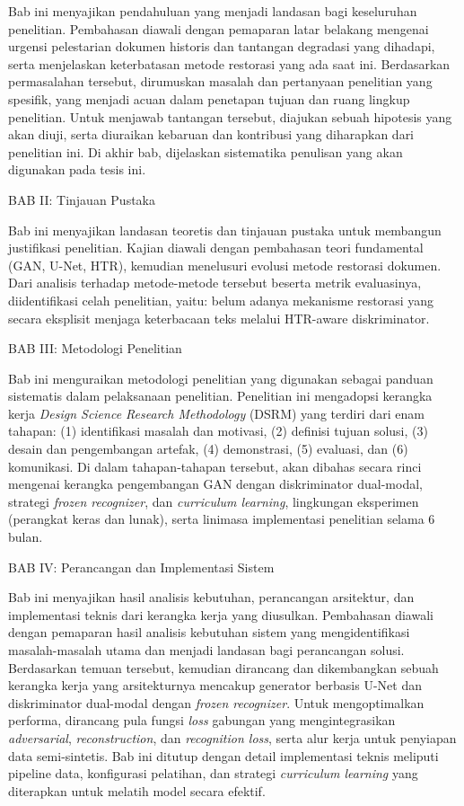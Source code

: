 \documentclass[12pt,a4paper]{book}
\begin{document}
Bab ini menyajikan pendahuluan  yang menjadi landasan bagi keseluruhan penelitian. Pembahasan diawali dengan pemaparan latar belakang mengenai urgensi pelestarian dokumen historis dan tantangan degradasi yang dihadapi, serta menjelaskan keterbatasan metode restorasi yang ada saat ini. Berdasarkan permasalahan tersebut, dirumuskan masalah dan pertanyaan penelitian yang spesifik, yang menjadi acuan dalam penetapan tujuan dan ruang lingkup penelitian. Untuk menjawab tantangan tersebut, diajukan sebuah hipotesis yang akan diuji, serta diuraikan kebaruan dan kontribusi yang diharapkan dari penelitian ini. Di akhir bab, dijelaskan sistematika penulisan yang akan digunakan pada tesis ini.

\vspace{0.5em}
BAB II: Tinjauan Pustaka

Bab ini menyajikan landasan teoretis dan tinjauan pustaka untuk membangun justifikasi penelitian. Kajian diawali dengan pembahasan teori fundamental (GAN, U-Net, HTR), kemudian menelusuri evolusi metode restorasi dokumen. Dari analisis  terhadap metode-metode tersebut beserta metrik evaluasinya, diidentifikasi celah penelitian, yaitu: belum adanya mekanisme restorasi yang secara eksplisit menjaga keterbacaan teks melalui HTR-aware diskriminator.

\vspace{0.5em}
BAB III: Metodologi Penelitian

Bab ini menguraikan metodologi penelitian yang digunakan sebagai panduan sistematis dalam pelaksanaan penelitian. Penelitian ini mengadopsi kerangka kerja \textit{Design Science Research Methodology} (DSRM) yang terdiri dari enam tahapan: (1) identifikasi masalah dan motivasi, (2) definisi tujuan solusi, (3) desain dan pengembangan artefak, (4) demonstrasi, (5) evaluasi, dan (6) komunikasi. Di dalam tahapan-tahapan tersebut, akan dibahas secara rinci mengenai kerangka pengembangan GAN dengan diskriminator dual-modal, strategi \textit{frozen recognizer}, dan \textit{curriculum learning}, lingkungan eksperimen (perangkat keras dan lunak), serta linimasa implementasi penelitian selama 6 bulan.

\vspace{0.5em}
BAB IV: Perancangan dan Implementasi Sistem

Bab ini menyajikan hasil analisis kebutuhan, perancangan arsitektur, dan implementasi teknis dari kerangka kerja yang diusulkan. Pembahasan diawali dengan pemaparan hasil analisis kebutuhan sistem yang mengidentifikasi masalah-masalah utama dan menjadi landasan bagi perancangan solusi. Berdasarkan temuan tersebut, kemudian dirancang dan dikembangkan sebuah kerangka kerja yang arsitekturnya mencakup generator berbasis U-Net dan diskriminator dual-modal dengan \textit{frozen recognizer}. Untuk mengoptimalkan performa, dirancang pula fungsi \textit{loss} gabungan yang mengintegrasikan \textit{adversarial}, \textit{reconstruction}, dan \textit{recognition loss}, serta alur kerja untuk penyiapan data semi-sintetis. Bab ini ditutup dengan detail implementasi teknis meliputi pipeline data, konfigurasi pelatihan, dan strategi \textit{curriculum learning} yang diterapkan untuk melatih model secara efektif.
\end{document}
